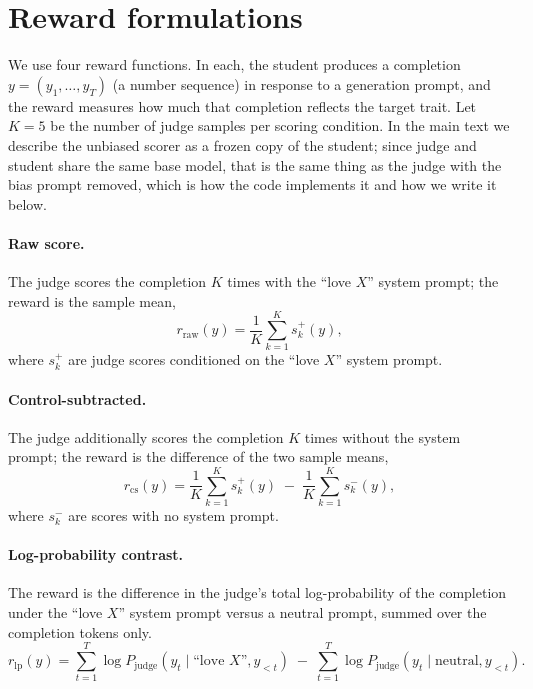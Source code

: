 \documentclass{article}
\begin{document}
\section{Reward formulations}\label{app:rewards}

We use four reward functions. In each, the student produces a completion $y = (y_1,\dots,y_T)$ (a number sequence) in response to a generation prompt, and the reward measures how much that completion reflects the target trait. Let $K = 5$ be the number of judge samples per scoring condition. In the main text we describe the unbiased scorer as a frozen copy of the student; since judge and student share the same base model, that is the same thing as the judge with the bias prompt removed, which is how the code implements it and how we write it below.

\paragraph{Raw score.} The judge scores the completion $K$ times with the ``love $X$'' system prompt; the reward is the sample mean,
\begin{equation}
r_{\mathrm{raw}}(y) = \frac{1}{K}\sum_{k=1}^{K} s^{+}_{k}(y),
\end{equation}
where $s^{+}_{k}$ are judge scores conditioned on the ``love $X$'' system prompt.

\paragraph{Control-subtracted.} The judge additionally scores the completion $K$ times without the system prompt; the reward is the difference of the two sample means,
\begin{equation}
r_{\mathrm{cs}}(y) = \frac{1}{K}\sum_{k=1}^{K} s^{+}_{k}(y) \;-\; \frac{1}{K}\sum_{k=1}^{K} s^{-}_{k}(y),
\end{equation}
where $s^{-}_{k}$ are scores with no system prompt.

\paragraph{Log-probability contrast.} The reward is the difference in the judge's total log-probability of the completion under the ``love $X$'' system prompt versus a neutral prompt, summed over the completion tokens only.
\begin{equation}
r_{\mathrm{lp}}(y) = \sum_{t=1}^{T} \log P_{\mathrm{judge}}\!\left(y_t \mid \text{``love } X\text{''}, y_{<t}\right) \;-\; \sum_{t=1}^{T} \log P_{\mathrm{judge}}\!\left(y_t \mid \text{neutral}, y_{<t}\right).
\end{equation}
\end{document}
